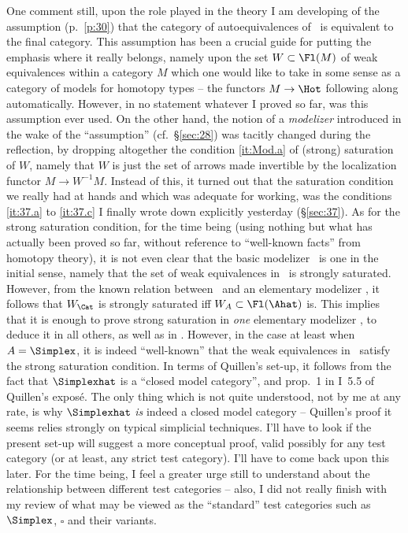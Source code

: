 \label{sec:41}%
One comment still, upon the role played in the theory I am developing
of the assumption (p.~\ref{p:30}) that the category of
autoequivalences of \Hot\ is equivalent to the final category. This
assumption has been a crucial guide for putting the emphasis where it
really belongs, namely upon the set $W\subset\Fl(M)$ of weak
equivalences within a category $M$ which one would like to take in
some sense as a category of models for homotopy types -- the functors
$M\to\Hot$ following along automatically. However, in no statement
whatever I proved so far, was this assumption ever used. On the other
hand, the notion of a \emph{modelizer} introduced in the wake of the
``assumption'' (cf.\ \S \ref{sec:28}) was tacitly changed during the
reflection, by dropping altogether the condition \ref{it:Mod.a} of
(strong) saturation of $W$, namely that $W$ is just the set of arrows
made invertible by the localization functor $M\to W^{-1}M$. Instead of
this, it turned out that the saturation condition we really had at
hands and which was adequate for working, was the conditions
\ref{it:37.a} to \ref{it:37.c} I finally wrote down explicitly
yesterday (\S \ref{sec:37}). As for the strong saturation condition,
for the time being (using nothing but what has actually been proved so
far, without reference to ``well-known facts'' from homotopy theory),
it is not even clear that the basic modelizer \Cat\ is one in the
initial sense, namely that the set of weak equivalences in
\Cat\ is strongly saturated. However, from the known relation between
\Cat\ and an elementary modelizer \Ahat, it follows that $W_\Cat$ is
strongly saturated if{f} $W_A\subset\Fl(\Ahat)$ is. This implies that
it is enough to prove strong saturation in \emph{one} elementary
modelizer \Ahat, to deduce it in all others, as well as in
\Cat. However, in the case at least when $A=\Simplex$, it is indeed
``well-known'' that the weak equivalences in \Ahat\ satisfy the strong
saturation condition. In terms of Quillen's set-up, it follows from
the fact that $\Simplexhat$ is a ``closed model category'', and prop.\
1 in I~5.5 of Quillen's expos\'e. The only thing which is not quite
understood, not by me at any rate, is why $\Simplexhat$ \emph{is}
indeed a closed model category -- Quillen's proof it seems relies
strongly on typical simplicial techniques. I'll have to look if the
present set-up will suggest a more conceptual proof, valid possibly
for any test category (or at least, any strict test category). I'll
have to come back upon this later. For the time being, I feel a
greater urge still to understand about the relationship between
different test categories -- also, I did not really finish with my
review of what may be viewed as the ``standard'' test categories such
as $\Simplex$, $\square$ and their variants.

